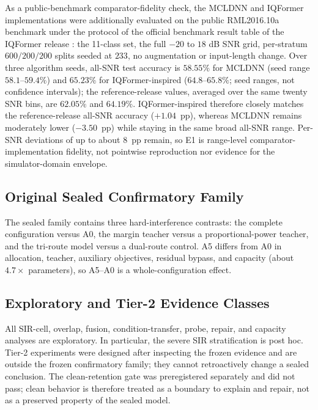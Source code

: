 \documentclass[letterpaper,journal]{IEEEtran}
\begin{document}
As a public-benchmark comparator-fidelity check, the MCLDNN and IQFormer
implementations were additionally evaluated on the public RML2016.10a benchmark
\cite{oshea2016cnn} under the protocol of the official benchmark result table
of the IQFormer release \cite{shao2025iqformercode}: the 11-class set, the
full $-20$ to $18$ dB SNR grid, per-stratum $600/200/200$ splits seeded at
$233$, no augmentation or input-length change. Over three algorithm seeds,
all-SNR test accuracy is $58.55\%$ for MCLDNN (seed range
$58.1$--$59.4\%$) and $65.23\%$ for IQFormer-inspired ($64.8$--$65.8\%$;
seed ranges, not confidence intervals); the reference-release values,
averaged over the same twenty SNR bins, are $62.05\%$ and $64.19\%$.
IQFormer-inspired therefore closely matches the
reference-release all-SNR accuracy ($+1.04$~pp), whereas MCLDNN remains
moderately lower ($-3.50$~pp) while staying in the same
broad all-SNR range. Per-SNR deviations of up to about $8$~pp remain, so E1 is
range-level comparator-implementation fidelity, not pointwise reproduction nor
evidence for the simulator-domain envelope.

\subsection{Original Sealed Confirmatory Family}
The sealed family contains three hard-interference contrasts: the complete
configuration versus A0, the margin teacher versus a proportional-power
teacher, and the tri-route model versus a dual-route control. A5 differs from
A0 in allocation, teacher, auxiliary objectives, residual bypass, and capacity
(about $4.7\times$ parameters), so A5--A0 is a whole-configuration effect.

\subsection{Exploratory and Tier-2 Evidence Classes}
All SIR-cell, overlap, fusion, condition-transfer, probe, repair, and
capacity analyses are exploratory. In particular, the severe SIR
stratification is post hoc. Tier-2 experiments were designed after inspecting
the frozen evidence and are outside the frozen confirmatory family; they cannot
retroactively change a sealed conclusion. The clean-retention gate was
preregistered separately and did not pass; clean behavior is therefore treated
as a boundary to explain and repair, not as a preserved property of the sealed
model.
\end{document}
